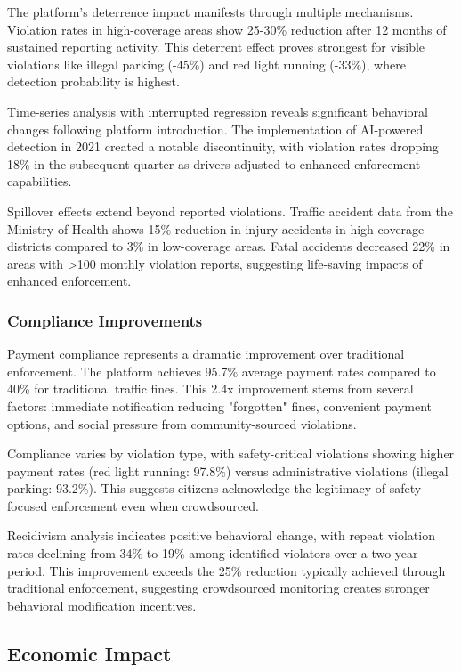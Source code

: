 \documentclass[pdflatex,sn-mathphys-num]{sn-jnl}%
\theoremstyle{thmstyleone}%
\theoremstyle{thmstyletwo}%
\theoremstyle{thmstylethree}%
\begin{document}
The platform's deterrence impact manifests through multiple mechanisms. Violation rates in high-coverage areas show 25-30\% reduction after 12 months of sustained reporting activity. This deterrent effect proves strongest for visible violations like illegal parking (-45\%) and red light running (-33\%), where detection probability is highest.

Time-series analysis with interrupted regression reveals significant behavioral changes following platform introduction. The implementation of AI-powered detection in 2021 created a notable discontinuity, with violation rates dropping 18\% in the subsequent quarter as drivers adjusted to enhanced enforcement capabilities.

Spillover effects extend beyond reported violations. Traffic accident data from the Ministry of Health shows 15\% reduction in injury accidents in high-coverage districts compared to 3\% in low-coverage areas. Fatal accidents decreased 22\% in areas with >100 monthly violation reports, suggesting life-saving impacts of enhanced enforcement.

\subsubsection{Compliance Improvements}

Payment compliance represents a dramatic improvement over traditional enforcement. The platform achieves 95.7\% average payment rates compared to 40\% for traditional traffic fines. This 2.4x improvement stems from several factors: immediate notification reducing "forgotten" fines, convenient payment options, and social pressure from community-sourced violations.

Compliance varies by violation type, with safety-critical violations showing higher payment rates (red light running: 97.8\%) versus administrative violations (illegal parking: 93.2\%). This suggests citizens acknowledge the legitimacy of safety-focused enforcement even when crowdsourced.

Recidivism analysis indicates positive behavioral change, with repeat violation rates declining from 34\% to 19\% among identified violators over a two-year period. This improvement exceeds the 25\% reduction typically achieved through traditional enforcement, suggesting crowdsourced monitoring creates stronger behavioral modification incentives.

\subsection{Economic Impact}\label{subsec17}
\end{document}
